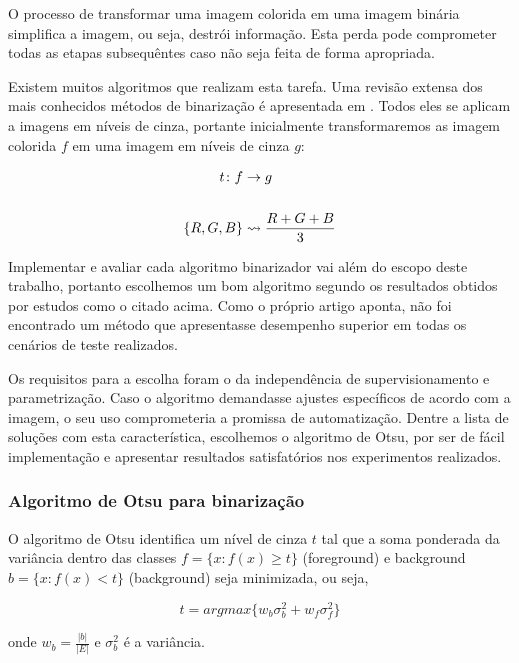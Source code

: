 \documentclass[a4paper,11pt]{article}
\begin{document}
O processo de transformar uma imagem colorida em uma imagem binária simplifica a imagem, ou seja, destrói informação. Esta perda pode comprometer todas as etapas subsequêntes caso não seja feita de forma apropriada.

Existem muitos algoritmos que realizam esta tarefa. Uma revisão extensa dos mais conhecidos métodos de binarização é apresentada em \cite{citeulike:890354}. Todos eles se aplicam a imagens em níveis de cinza, portante inicialmente transformaremos as imagem colorida $f$ em uma imagem em níveis de cinza $g$:

\begin{equation}
  \begin{split}
    t \colon f &\to g\\
    \cr \{ R, G, B \} &\rightsquigarrow \frac{R + G + B}{3}
  \end{split}
\end{equation}

Implementar e avaliar cada algoritmo binarizador vai além do escopo deste trabalho, portanto escolhemos um bom algoritmo segundo os resultados obtidos por estudos como o citado acima. Como o próprio artigo aponta, não foi encontrado um método que apresentasse desempenho superior em todas os cenários de teste realizados.

Os requisitos para a escolha foram o da independência de supervisionamento e parametrização. Caso o algoritmo demandasse ajustes específicos de acordo com a imagem, o seu uso comprometeria a promissa de automatização. Dentre a lista de soluções com esta característica, escolhemos o algoritmo de Otsu, por ser de fácil implementação e apresentar resultados satisfatórios nos experimentos realizados.

\subsubsection{Algoritmo de Otsu para binarização}

O algoritmo de Otsu \cite{1979:ots} identifica um nível de cinza $t$ tal que a soma ponderada da variância dentro das classes $f = \{ x \colon f(x) \geq t \}$ (foreground) e background $b = \{ x \colon f(x) < t \}$ (background) seja minimizada, ou seja,

\begin{equation}
  t = arg max \{ w_b \sigma^{2}_{b} + w_f \sigma^{2}_{f} \}
\end{equation}

onde $w_b = \frac{|b|}{|E|}$ e $\sigma^{2}_{b}$ é a variância.
\end{document}
